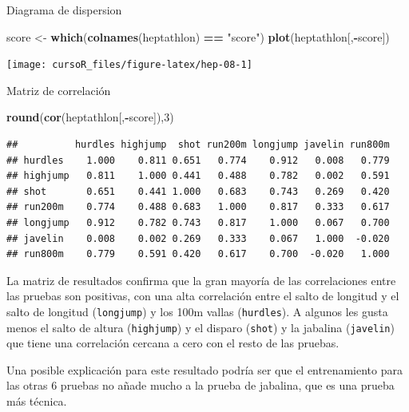 \documentclass[]{book}
\newenvironment{Shaded}{\begin{snugshade}}{\end{snugshade}}
\newcommand{\KeywordTok}[1]{\textcolor[rgb]{0.13,0.29,0.53}{\textbf{#1}}}
\newcommand{\DecValTok}[1]{\textcolor[rgb]{0.00,0.00,0.81}{#1}}
\newcommand{\StringTok}[1]{\textcolor[rgb]{0.31,0.60,0.02}{#1}}
\newcommand{\OperatorTok}[1]{\textcolor[rgb]{0.81,0.36,0.00}{\textbf{#1}}}
\newcommand{\NormalTok}[1]{#1}
\begin{document}
Diagrama de dispersion

\begin{Shaded}
\begin{Highlighting}[]
\NormalTok{score <-}\StringTok{ }\KeywordTok{which}\NormalTok{(}\KeywordTok{colnames}\NormalTok{(heptathlon) }\OperatorTok{==}\StringTok{ "score"}\NormalTok{)}
\KeywordTok{plot}\NormalTok{(heptathlon[,}\OperatorTok{-}\NormalTok{score])}
\end{Highlighting}
\end{Shaded}

\begin{center}\texttt{[image: cursoR\_files/figure-latex/hep-08-1]} \end{center}

Matriz de correlación

\begin{Shaded}
\begin{Highlighting}[]
\KeywordTok{round}\NormalTok{(}\KeywordTok{cor}\NormalTok{(heptathlon[,}\OperatorTok{-}\NormalTok{score]),}\DecValTok{3}\NormalTok{)}
\end{Highlighting}
\end{Shaded}

\begin{verbatim}
##          hurdles highjump  shot run200m longjump javelin run800m
## hurdles    1.000    0.811 0.651   0.774    0.912   0.008   0.779
## highjump   0.811    1.000 0.441   0.488    0.782   0.002   0.591
## shot       0.651    0.441 1.000   0.683    0.743   0.269   0.420
## run200m    0.774    0.488 0.683   1.000    0.817   0.333   0.617
## longjump   0.912    0.782 0.743   0.817    1.000   0.067   0.700
## javelin    0.008    0.002 0.269   0.333    0.067   1.000  -0.020
## run800m    0.779    0.591 0.420   0.617    0.700  -0.020   1.000
\end{verbatim}

La matriz de resultados confirma que la gran mayoría de las
correlaciones entre las pruebas son positivas, con una alta correlación
entre el salto de longitud y el salto de longitud (\texttt{longjump}) y
los 100m vallas (\texttt{hurdles}). A algunos les gusta menos el salto
de altura (\texttt{highjump}) y el disparo (\texttt{shot}) y la jabalina
(\texttt{javelin}) que tiene una correlación cercana a cero con el resto
de las pruebas.

Una posible explicación para este resultado podría ser que el
entrenamiento para las otras 6 pruebas no añade mucho a la prueba de
jabalina, que es una prueba más técnica.
\end{document}
